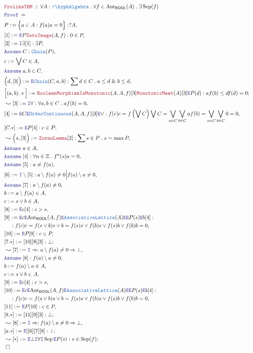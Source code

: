 \documentclass[12pt]{scrartcl}
\newcommand{\TYPE}[1]{\textcolor{NavyBlue}{\mathtt{#1}}}
\newcommand{\LOGIC}[1]{\textcolor{Blue}{\mathtt{#1}}}
\newcommand{\THM}[1]{\textcolor{Maroon}{\mathtt{#1}}}
\renewcommand{\.}{\; . \;}
\newcommand{\de}{: \kern 0.1pc =}
\newcommand{\Theorem}[2]{& \THM{#1} \, :: \, #2 \\ & \Proof = \\ }
\newcommand{\NewLine}{\\ & \kern 1pc}
\newcommand{\Page}[1]{ \begin{align*} #1 \end{align*}   }
\renewcommand{\And}{\; \& \;}
\newcommand{\Imply}{\Rightarrow}
\newcommand{\Intro}{\LOGIC{I}}
\newcommand{\Elim}{\LOGIC{E}}
\newcommand{\Int}{\mathbb{Z} }
\newcommand{\Aut}{\mathrm{Aut}}
\newcommand{\Say}[3]{& #1 \de #2 : #3, \\}
\newcommand{\SayIn}[3]{& #1 \de #2 \in #3, \\}
\newcommand{\Conclude}[3]{& #1 \de #2 : #3; \\}
\newcommand{\Derive}[3]{& \leadsto #1 \de #2 : #3, \\}
\newcommand{\DeriveConclude}[3]{& \leadsto #1 \de #2 : #3 ; \\}
\newcommand{\Assume}[2]{& \LOGIC{Assume} \; #1 : #2, \\}
\newcommand{\AssumeIn}[2]{& \LOGIC{Assume} \; #1 \in #2, \\}
\newcommand{\QED}{\; \square}
\newcommand{\EndProof}{& \QED \\}
\newcommand{\Proof}{\LOGIC{Proof} \; }
\newcommand{\oC}{\TYPE{OrderContinuous}}
\newcommand{\TAlgebra}{\TYPE{\tau\hyph Algebra}}
\DeclareMathOperator{\Sep}{Sep}
\newcommand{\BOOL}{\mathsf{BOOL}}
\begin{document}
\Page{
	\Theorem{FroliksTHM}
	{
		\forall A : \TAlgebra \.
		\forall f \in \Aut_\BOOL(A) \.
		\exists \Sep(f)
	}
	\Say{P}{\Big\{ a \in A : f(a)a  = 0\Big\}}{?A}
	\Say{[1]}{\Elim P \THM{ZeroImage}(A,f)}{0 \in P}
	\Say{[2]}{\Intro \exists [1]}{\exists P}
	\Assume{C}{\TYPE{Chain}(P)}
	\SayIn{c}{\bigvee C}{A}
	\AssumeIn{a,b}{C}
	\Say{\Big(d, [3] \Big)}{\Elim \TYPE{Chain}(C,a,b)}
	{
		\sum d \in C \.  a \le d \And b \le d
	}
	\Conclude{\Big[(a,b).*\Big]}
	{
		\THM{BooleanMorphismIsMonotonic}(A,A,f)[3]
		\THM{MonotonicMeet}(A)[3]		
		\Elim P(d)	
	}
	{
		af(b) \le df(d) = 0 
	}
	\Derive{[3]}{\Intro \forall}{\forall a,b \in C \. af(b) = 0}
	\Say{[4]}{\Elim C \Elim \oC(A,A,f) [3] \Elim \vee}
	{
		f(c)c = 
		f\left(\bigvee C \right) \bigvee C  = 
		\bigvee_{a \in C} \bigvee_{b \in C} a f(b) = 
		\bigvee_{a \in C} \bigvee_{b \in C} 0 =
		0
	}
	\Conclude{[C.*]}{\Elim P [4]}{c \in P}
	\Derive{\Big(s,[3]\Big)}{\THM{ZornsLemma}[2]}
	{
		\sum s \in P \. s = \max P
	}
	\AssumeIn{a}{A}
	\Assume{[4]}{\forall n \in \Int \. f^n(s)a = 0 }
	\Assume{[5]}{a \neq f(a)}
	\Say{[6]}{\Intro \setminus [5]}{a \setminus f(a) \neq 0 \Big| f(a) \setminus a \neq 0}
	\Assume{[7]}{ a \setminus f(a) \neq 0 }
	\SayIn{b}{a \setminus f(a)}{A}
	\SayIn{c}{s \vee b}{A}
	\Say{[8]}{\Elim c [4]}{c > s}
	\Say{[9]}{ 
		\Elim c 
		\Elim \Aut_\BOOL(A,f) \Elim \TYPE{AssociativeLattice}(A) \Elim   
		\Elim P(s) \Elim b [4] 	
	}
	{
			\NewLine :			
			f(c)c = 
			f(s \vee b)s \vee b  =
			f(s)s \vee f(b)s \vee f(s)b \vee f(b)b = 0
	}
	\Say{[10]}{\Elim P [9]}{c \in P}
	\Conclude{[7.*]}{[10][8][3]}{\bot}
	\Derive{[7]}{\Intro \Imply}{  a \setminus f(a) \neq 0 \Imply \bot    }
	\Assume{[8]}{ f(a) \setminus a \neq 0 }
	\SayIn{b}{f(a) \setminus a}{A}
	\SayIn{c}{s \vee b}{A}
	\Say{[9]}{\Elim c [4]}{c > s}
	\Say{[10]}{ 
		\Elim c 
		\Elim \Aut_\BOOL(A,f) \Elim \TYPE{AssociativeLattice}(A) \Elim   
		\Elim P(s) \Elim b [4] 	
	}
	{
			\NewLine :			
			f(c)c = 
			f(s \vee b)s \vee b  =
			f(s)s \vee f(b)s \vee f(s)b \vee f(b)b = 0
	}
	\Say{[11]}{\Elim P [10]}{c \in P}
	\Conclude{[8.*]}{[11][9][3]}{\bot}
	\Derive{[8]}{\Intro \Imply}{  f(a) \setminus a \neq 0 \Imply \bot }
	\Conclude{[a.*]}{\Elim | [6][7][8]}{\bot}
	\DeriveConclude{[*]}{\Elim \bot \Intro \forall \Intro \Sep \Elim P(s)}
	{s \in \Sep(f)}
	\EndProof	
}
\newpage
\end{document}
